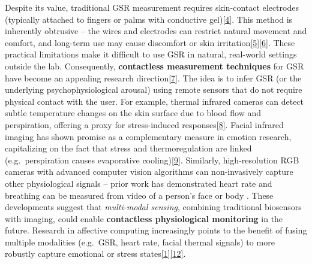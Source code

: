 \documentclass[12pt,a4paper]{article}
\begin{document}
Despite its value, traditional GSR measurement requires skin-contact electrodes (typically attached to fingers or palms with conductive gel)\href{docs/thesis_report/draft/Chapter_1__Introduction.md\#L10-L18}{{[}4{]}}. This method is inherently obtrusive -- the wires and electrodes can restrict natural movement and comfort, and long-term use may cause discomfort or skin irritation\href{docs/thesis_report/draft/Chapter_1__Introduction.md\#L14-L22}{{[}5{]}}\href{docs/thesis_report/draft/Chapter_1__Introduction.md\#L18-L26}{{[}6{]}}. These practical limitations make it difficult to use GSR in natural, real-world settings outside the lab. Consequently, \textbf{contactless measurement techniques} for GSR have become an appealing research direction\href{docs/thesis_report/draft/Chapter_1__Introduction.md\#L24-L31}{{[}7{]}}. The idea is to infer GSR (or the underlying psychophysiological arousal) using remote sensors that do not require physical contact with the user. For example, thermal infrared cameras can detect subtle temperature changes on the skin surface due to blood flow and perspiration, offering a proxy for stress-induced responses\href{https://pmc.ncbi.nlm.nih.gov/articles/PMC8187483/\#:~:text=measures\%20targeting\%20a\%20variety\%20of,in\%20affective\%20research7\%20\%E2\%80\%93\%2032}{{[}8{]}}. Facial infrared imaging has shown promise as a complementary measure in emotion research, capitalizing on the fact that stress and thermoregulation are linked (e.g.~perspiration causes evaporative cooling)\href{https://pmc.ncbi.nlm.nih.gov/articles/PMC8187483/\#:~:text=compliments\%20the\%20traditional\%20measures\%20is,results\%20in\%20affective\%20research\%2031\%E2\%80\%939}{{[}9{]}}. Similarly, high-resolution RGB cameras with advanced computer vision algorithms can non-invasively capture other physiological signals -- prior work has demonstrated heart rate and breathing can be measured from video of a person's face or body \citep{AppliedSciences2020AffectiveComputing, TechScience2021StressRecognition}. These developments suggest that \emph{multi-modal sensing}, combining traditional biosensors with imaging, could enable \textbf{contactless physiological monitoring} in the future. Research in affective computing increasingly points to the benefit of fusing multiple modalities (e.g.~GSR, heart rate, facial thermal signals) to more robustly capture emotional or stress states\href{https://pmc.ncbi.nlm.nih.gov/articles/PMC8187483/\#:~:text=Galvanic\%20skin\%20response\%20,conditions\%20which\%20recent\%20studies\%20have}{{[}1{]}}\href{https://pmc.ncbi.nlm.nih.gov/articles/PMC8187483/\#:~:text=compliments\%20the\%20traditional\%20measures\%20is,results\%20in\%20affective\%20research\%2031\%E2\%80\%939}{{[}12{]}}.
\end{document}
